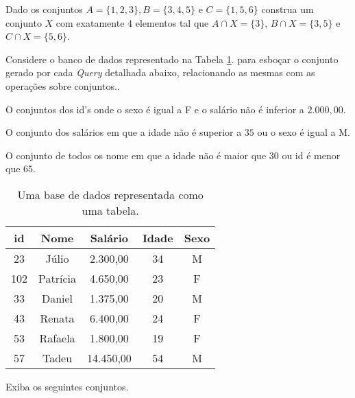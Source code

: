 \begin{questao}\label{test:Conjuntos12}
	Dado os conjuntos $A = \{1, 2, 3\}, B = \{3,4,5\}$ e $C = \{1, 5, 6\}$ construa um conjunto $X$ com exatamente $4$ elementos tal que $A \cap X = \{3\}$, $B \cap X =\{3, 5\}$ e $C \cap X = \{5, 6\}$.
\end{questao}

\begin{questao}\label{test:Conjuntos13}
	Considere o banco de dados representado na Tabela  \ref{tab:TabelaBaseDeDados1}. para esboçar o conjunto gerado por cada  \textit{Query} detalhada abaixo, relacionando as mesmas com as operações sobre conjuntos..
\end{questao}

\begin{exerList}
	\item O conjuntos dos id's onde o sexo é igual a F e o salário não é inferior a $2.000,00$.
	\item O conjunto dos salários em que a idade não é superior a $35$ ou o sexo é igual a M.
	\item O conjunto de todos os nome em que a idade não é maior que $30$ ou id é menor que $65$.
\end{exerList}

\begin{table}[h]
	\centering
	\begin{tabular}{ccccc}
		\hline
		id & Nome & Salário & Idade & Sexo \\
		\hline
		23 & Júlio & 2.300,00 & 34 & M \\
		102 & Patrícia & 4.650,00 & 23 & F \\
		33 & Daniel & 1.375,00 & 20 & M \\
		43 & Renata & 6.400,00 & 24 & F \\
		53 & Rafaela & 1.800,00 & 19 & F \\
		57 & Tadeu & 14.450,00 & 54 & M \\
		\hline
	\end{tabular}
	\caption{Uma base de dados representada como uma tabela.}
	\label{tab:TabelaBaseDeDados1}
\end{table}

\begin{questao}\label{test:Conjuntos14}
	Exiba os seguintes conjuntos.
\end{questao}

